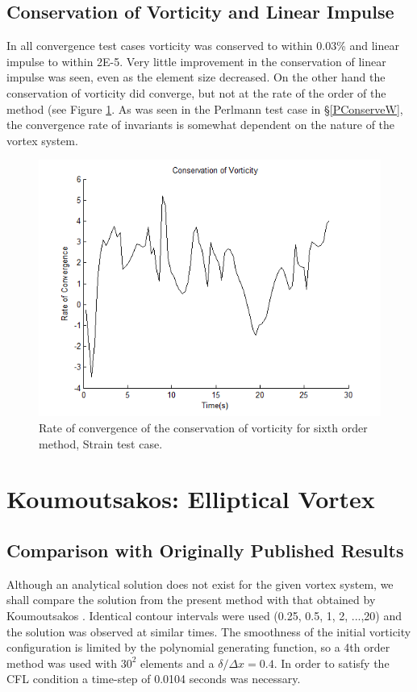 \documentclass[letterpaper,12pt]{report}
\begin{document}
\subsection{Conservation of Vorticity and Linear Impulse}
In all convergence test cases vorticity was conserved to within 0.03\% and linear impulse to within 2E-5. Very little improvement in the conservation of linear impulse was seen, even as the element size decreased. On the other hand the conservation of vorticity did converge, but not at the rate of the order of the method (see Figure \ref{fig:StrainConserve}. As was seen in the Perlmann test case in \S\ref{PConserveW}, the convergence rate of invariants is somewhat dependent on the nature of the vortex system.
\begin{figure}
\centering
\includegraphics[width=1\textwidth]{StrainConserve.PNG}
\caption{\label{fig:StrainConserve}Rate of convergence of the conservation of vorticity for sixth order method, Strain test case. }
\end{figure}

\section{Koumoutsakos: Elliptical Vortex}
%
\subsection{Comparison with Originally Published Results}\label{KoumComper}
Although an analytical solution does not exist for the given vortex system, we shall compare the solution from the present method with that obtained by Koumoutsakos \cite{Koum1997}. Identical contour intervals were used (0.25, 0.5, 1, 2, ...,20) and the solution was observed at similar times. The smoothness of the initial vorticity configuration is limited by the polynomial generating function, so a 4th order method was used with $30^2$ elements and a $\delta/\Delta x=0.4$. In order to satisfy the CFL condition a time-step of 0.0104 seconds was necessary.
\end{document}
